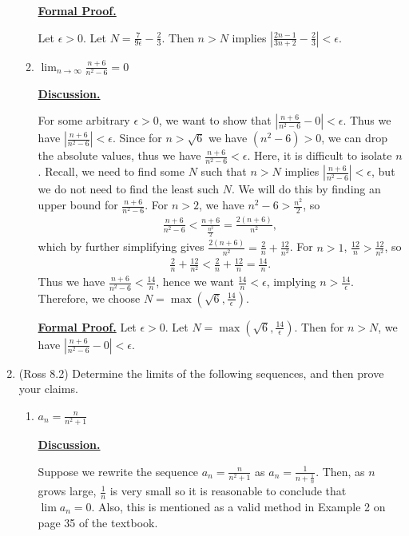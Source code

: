 \documentclass [10pt]{article}
\newcommand{\jg}[1]{{\color{blue} #1}}
\begin{document}
\begin{enumerate}
\begin{enumerate}
{\textbf{\underline{Formal Proof.}}

Let $\epsilon > 0$. Let $N = \frac{7}{9 \epsilon} - \frac{2}{3}$. Then $n > N$ implies $|\frac{2n-1}{3n+2}-\frac{2}{3}| < \epsilon$. \\
}
\item $\lim_{n \to \infty} \frac{n+6}{n^2-6}=0$

\jg{
\textbf{\underline{Discussion.}}

For some arbitrary $\epsilon > 0$, we want to show that $|\frac{n+6}{n^2-6} - 0| < \epsilon$. Thus we have $|\frac{n+6}{n^2-6}| < \epsilon$. Since for $n > \sqrt{6}$ we have $(n^2 - 6)>0$, we can drop the absolute values, thus we have $\frac{n+6}{n^2-6} < \epsilon$. Here, it is difficult to isolate $n$. Recall, we need to find some $N$ such that $n>N$ implies $|\frac{n+6}{n^2-6}| < \epsilon$, but we do not need to find the least such $N$. We will do this by finding an upper bound for $\frac{n+6}{n^2 - 6}$. For $n>2$, we have $n^2 - 6 > \frac{n^2}{2}$, so 
\begin{align*}
    \frac{n+6}{n^2-6} < \frac{n+6}{\frac{n^2}{2}} = \frac{2(n+6)}{n^2}, 
\end{align*}
which by further simplifying gives $\frac{2(n+6)}{n^2} = \frac{2}{n} + \frac{12}{n^2}$. For $n>1$, $\frac{12}{n} > \frac{12}{n^2}$, so 
\begin{align*}
    \frac{2}{n} + \frac{12}{n^2} < \frac{2}{n} + \frac{12}{n} = \frac{14}{n}. 
\end{align*}
Thus we have $\frac{n+6}{n^2 - 6} < \frac{14}{n}$, hence we want $\frac{14}{n} < \epsilon$, implying $n > \frac{14}{\epsilon}$. Therefore, we choose $N = \max (\sqrt{6}, \frac{14}{\epsilon})$.

\textbf{\underline{Formal Proof.}}
Let $\epsilon>0$. Let $N = \max (\sqrt{6}, \frac{14}{\epsilon})$. Then for $n > N$, we have $|\frac{n+6}{n^2-6}-0| < \epsilon$.
}

\end{enumerate}
\clearpage

\item (Ross 8.2) Determine the limits of the following sequences, and then prove
your claims.
\begin{enumerate}
\item $a_n = \frac{n}{n^2+1}$

\jg{
\textbf{\underline{Discussion.}}

Suppose we rewrite the sequence $a_n = \frac{n}{n^2+1}$ as $a_n = \frac{1}{n + \frac{1}{n}}$. Then, as $n$ grows large, $\frac{1}{n}$ is very small so it is reasonable to conclude that $\lim a_n = 0$. Also, this is mentioned as a valid method in Example 2 on page 35 of the textbook. 

}
\end{enumerate}
\end{enumerate}
\end{document}
